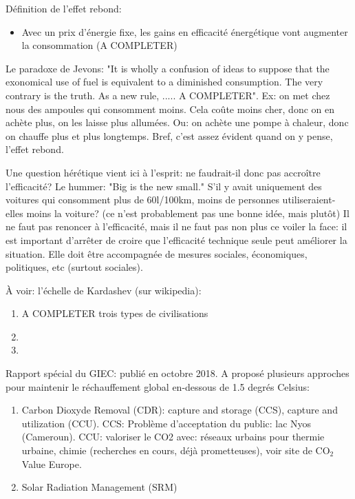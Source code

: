 \documentclass{article}
\begin{document}
 Définition de l'effet rebond:
 \begin{itemize}
 	\item Avec un prix d'énergie fixe, les gains en efficacité énergétique vont augmenter la consommation (A COMPLETER)
 \end{itemize}
 Le paradoxe de Jevons: "It is wholly a confusion of ideas to suppose that the exonomical use of fuel is equivalent to a diminished consumption. The very contrary is the truth. As a new rule, ..... A COMPLETER". Ex: on met chez nous des ampoules qui consomment moins. Cela coûte moins cher, donc on en achète plus, on les laisse plus allumées. Ou: on achète une pompe à chaleur, donc on chauffe plus et plus longtemps. Bref, c'est assez évident quand on y pense, l'effet rebond. \par
 Une question hérétique vient ici à l'esprit: ne faudrait-il donc pas accroître l'efficacité? Le hummer: "Big is the new small." S'il y avait uniquement des voitures qui consomment plus de 60l/100km, moins de personnes utiliseraient-elles moins la voiture? (ce n'est probablement pas une bonne idée, mais plutôt)
 Il ne faut pas renoncer à l'efficacité, mais il ne faut pas non plus ce voiler la face: il est important d'arrêter de croire que l'efficacité technique seule peut améliorer la situation. Elle doit être accompagnée de mesures sociales, économiques, politiques, etc (surtout sociales). \par
 À voir: l'échelle de Kardashev (sur wikipedia):
 \begin{enumerate}
 	\item A COMPLETER trois types de civilisations
 	\item 
 	\item 
 \end{enumerate}
Rapport spécial du GIEC: publié en octobre 2018. A proposé plusieurs approches pour maintenir le réchauffement global en-dessous de 1.5 degrés Celsius:
\begin{enumerate}
	\item Carbon Dioxyde Removal (CDR): capture and storage (CCS), capture and utilization (CCU). CCS: Problème d'acceptation du public: lac Nyos (Cameroun). CCU: valoriser le CO2 avec: réseaux urbains pour thermie urbaine, chimie (recherches en cours, déjà prometteuses), voir site de CO$_2$ Value Europe.
	\item Solar Radiation Management (SRM)
\end{enumerate}
\end{document}
